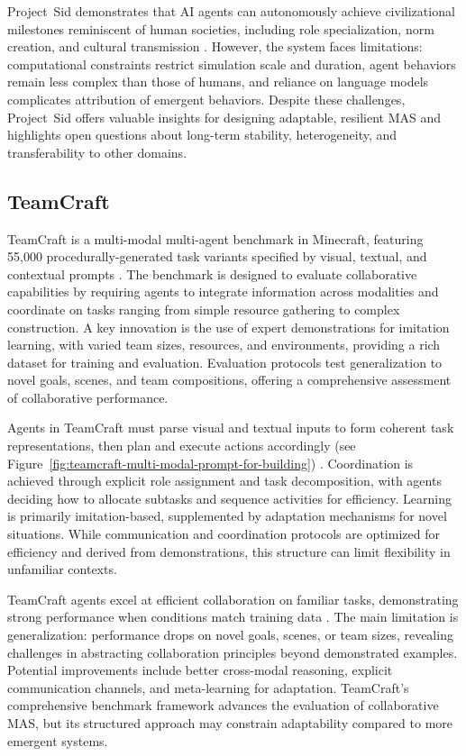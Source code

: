 \documentclass[a4paper, 12pt]{article}
\begin{document}
Project~Sid demonstrates that AI agents can autonomously achieve civilizational milestones reminiscent of human societies, including role specialization, norm creation, and cultural transmission \autocite{Altera2024}. However, the system faces limitations: computational constraints restrict simulation scale and duration, agent behaviors remain less complex than those of humans, and reliance on language models complicates attribution of emergent behaviors. Despite these challenges, Project~Sid offers valuable insights for designing adaptable, resilient MAS and highlights open questions about long-term stability, heterogeneity, and transferability to other domains.

\subsection{TeamCraft}

TeamCraft is a multi-modal multi-agent benchmark in Minecraft, featuring 55,000 procedurally-generated task variants specified by visual, textual, and contextual prompts \autocite{Long2024}. The benchmark is designed to evaluate collaborative capabilities by requiring agents to integrate information across modalities and coordinate on tasks ranging from simple resource gathering to complex construction. A key innovation is the use of expert demonstrations for imitation learning, with varied team sizes, resources, and environments, providing a rich dataset for training and evaluation. Evaluation protocols test generalization to novel goals, scenes, and team compositions, offering a comprehensive assessment of collaborative performance.

Agents in TeamCraft must parse visual and textual inputs to form coherent task representations, then plan and execute actions accordingly (see Figure~\ref{fig:teamcraft-multi-modal-prompt-for-building}) \autocite{Long2024}. Coordination is achieved through explicit role assignment and task decomposition, with agents deciding how to allocate subtasks and sequence activities for efficiency. Learning is primarily imitation-based, supplemented by adaptation mechanisms for novel situations. While communication and coordination protocols are optimized for efficiency and derived from demonstrations, this structure can limit flexibility in unfamiliar contexts.

TeamCraft agents excel at efficient collaboration on familiar tasks, demonstrating strong performance when conditions match training data \autocite{Long2024}. The main limitation is generalization: performance drops on novel goals, scenes, or team sizes, revealing challenges in abstracting collaboration principles beyond demonstrated examples. Potential improvements include better cross-modal reasoning, explicit communication channels, and meta-learning for adaptation. TeamCraft's comprehensive benchmark framework advances the evaluation of collaborative MAS, but its structured approach may constrain adaptability compared to more emergent systems.
\end{document}
